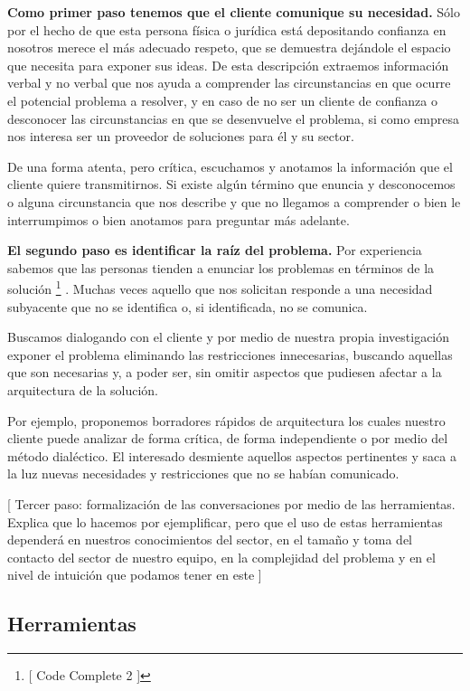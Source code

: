 \textbf{Como primer paso tenemos que el cliente comunique su necesidad.} Sólo por el hecho de que esta
persona física o jurídica está depositando confianza en nosotros merece el más
adecuado respeto, que se demuestra dejándole el espacio que necesita para exponer
sus ideas. De esta descripción extraemos información verbal y
no verbal que nos ayuda a comprender las circunstancias en que ocurre el potencial
problema a resolver, y en caso de no ser un cliente de confianza o desconocer las
circunstancias en que se desenvuelve el problema, si como empresa nos interesa
ser un proveedor de soluciones para él y su sector.

De una forma atenta, pero crítica, escuchamos y anotamos la información que el
cliente quiere transmitirnos. Si existe algún término que enuncia y desconocemos
o alguna circunstancia que nos describe y que no llegamos a comprender o bien le
interrumpimos o bien anotamos para preguntar más adelante.

\textbf{El segundo paso es identificar la raíz del problema.} Por experiencia sabemos
que las personas tienden a enunciar los problemas en términos de la solución%
%
\footnote{[ Code Complete 2 ]
}%
. Muchas veces aquello que nos solicitan responde a una necesidad subyacente que no
se identifica o, si identificada, no se comunica.

Buscamos dialogando con el cliente y por medio de nuestra propia investigación exponer
el problema eliminando las restricciones innecesarias, buscando aquellas que son
necesarias y, a poder ser, sin omitir aspectos que pudiesen afectar a la arquitectura
de la solución.

Por ejemplo, proponemos borradores rápidos de arquitectura los cuales
nuestro cliente puede analizar de forma crítica, de forma independiente
o por medio del método dialéctico. El interesado desmiente aquellos aspectos
pertinentes y saca a la luz nuevas necesidades y restricciones que no se habían
comunicado.

[ Tercer paso: formalización de las conversaciones por medio de las herramientas.
Explica que lo hacemos por ejemplificar, pero que el uso de estas herramientas
dependerá en nuestros conocimientos del sector, en el tamaño y toma del contacto
del sector de nuestro equipo, en la complejidad del problema y en el nivel de intuición
que podamos tener en este ]

\subsection{Herramientas}

